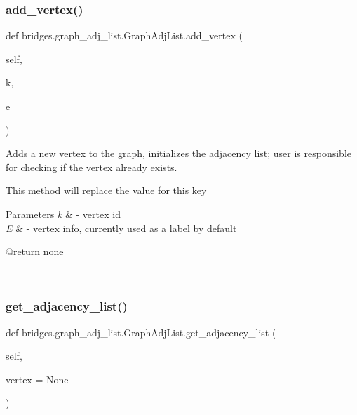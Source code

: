 \subsubsection{\texorpdfstring{add\+\_\+vertex()}{add\_vertex()}}
{\footnotesize\ttfamily def bridges.\+graph\+\_\+adj\+\_\+list.\+Graph\+Adj\+List.\+add\+\_\+vertex (\begin{DoxyParamCaption}\item[{}]{self,  }\item[{}]{k,  }\item[{}]{e }\end{DoxyParamCaption})}



Adds a new vertex to the graph, initializes the adjacency list; user is responsible for checking if the vertex already exists. 

This method will replace the value for this key


\begin{DoxyParams}{Parameters}
{\em k} & -\/ vertex id \\
\hline
{\em E} & -\/ vertex info, currently used as a label by default \begin{DoxyVerb}@return none\end{DoxyVerb}
 \\
\hline
\end{DoxyParams}
\mbox{\label{classbridges_1_1graph__adj__list_1_1_graph_adj_list_a523adce952c66505abc5ad14a83ae4c4}} 
\subsubsection{\texorpdfstring{get\+\_\+adjacency\+\_\+list()}{get\_adjacency\_list()}}
{\footnotesize\ttfamily def bridges.\+graph\+\_\+adj\+\_\+list.\+Graph\+Adj\+List.\+get\+\_\+adjacency\+\_\+list (\begin{DoxyParamCaption}\item[{}]{self,  }\item[{}]{vertex = {\ttfamily None} }\end{DoxyParamCaption})}



